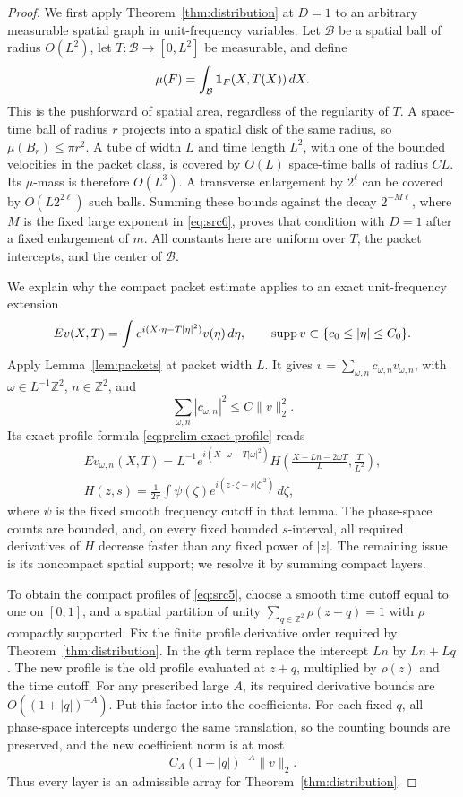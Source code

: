\begin{proof}
We first apply Theorem~\ref{thm:distribution} at $D=1$ to an arbitrary
measurable spatial graph in unit-frequency variables.  Let
$\mathcal B$ be a spatial ball of radius $O(L^2)$, let
$T:\mathcal B\to[0,L^2]$ be measurable, and define
\begin{equation}
 \mu(F)=\int_{\mathcal B}{\bf1}_F(X,T(X))\,dX.
 \label{eq:endpoint-graph-measure}
\end{equation}
This is the pushforward of spatial area, regardless of the regularity of
$T$.  A space-time ball of radius $r$ projects into a spatial disk of the
same radius, so $\mu(B_r)\le\pi r^2$.  A tube of width $L$ and time length
$L^2$, with one of the bounded velocities in the packet class, is covered
by $O(L)$ space-time balls of radius $CL$.  Its $\mu$-mass is therefore
$O(L^3)$.  A transverse enlargement by $2^\ell$ can be covered by
$O(L2^{2\ell})$ such balls.  Summing these bounds against the decay
$2^{-M\ell}$, where $M$ is the fixed large exponent in
\eqref{eq:src6}, proves that condition with $D=1$ after a fixed enlargement
of $m$.  All constants here are uniform over $T$, the packet intercepts,
and the center of $\mathcal B$.

We explain why the compact packet estimate applies to an exact
unit-frequency extension
\[
 Ev(X,T)=\int e^{i(X\cdot\eta-T|\eta|^2)}v(\eta)\,d\eta,
 \qquad \operatorname{supp} v\subset\{c_0\le |\eta|\le C_0\}.
\]
Apply Lemma~\ref{lem:packets} at packet width $L$.  It gives
$v=\sum_{\omega,n}c_{\omega,n}v_{\omega,n}$, with
$\omega\in L^{-1}\mathbb Z^2$, $n\in\mathbb Z^2$, and
\[
 \sum_{\omega,n}|c_{\omega,n}|^2\le C\|v\|_2^2.
\]
Its exact profile formula \eqref{eq:prelim-exact-profile} reads
\[
\begin{gathered}
 Ev_{\omega,n}(X,T)
 =L^{-1}e^{i(X\cdot\omega-T|\omega|^2)}
 H\left(\frac{X-Ln-2\omega T}{L},\frac{T}{L^2}\right),
 \\[2pt]
 H(z,s)=\frac1{2\pi}\int\psi(\zeta)
                   e^{i(z\cdot\zeta-s|\zeta|^2)}\,d\zeta,
\end{gathered}
\]
where $\psi$ is the fixed smooth frequency cutoff in that lemma.
The phase-space counts are bounded, and, on every fixed bounded
$s$-interval, all required derivatives of $H$ decrease faster than
any fixed power of $|z|$.  The remaining issue is its noncompact
spatial support; we resolve it by summing compact layers.

To obtain the compact profiles of \eqref{eq:src5}, choose a smooth time
cutoff equal to one on $[0,1]$, and a spatial partition of unity
$\sum_{q\in\mathbb Z^2}\rho(z-q)=1$ with $\rho$ compactly supported.
Fix the finite profile derivative order required by
Theorem~\ref{thm:distribution}.  In the $q$th term replace the intercept $Ln$ by
$Ln+Lq$.  The new profile is the old profile evaluated at
$z+q$, multiplied by $\rho(z)$ and the time cutoff.  For any prescribed
large $A$, its required derivative bounds are
$O((1+|q|)^{-A})$.  Put this factor into the coefficients.  For each fixed
$q$, all phase-space intercepts undergo the same translation, so the
counting bounds are preserved, and the new coefficient norm is at most
\[
 C_A(1+|q|)^{-A}\|v\|_2.
\]
Thus every layer is an admissible array for Theorem~\ref{thm:distribution}.


\end{proof}
